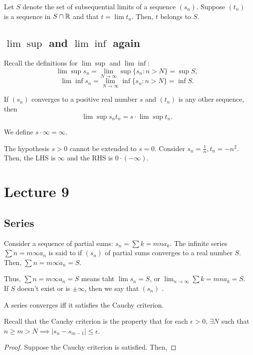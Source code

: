 \documentclass{book}
\begin{document}
\begin{thm}
    Let $S$ denote the set of subsequential limits of a sequence $(s_n)$. Suppose $(t_n)$ is a sequence in $S \cap \mathbb{R}$ and that $t = \lim t_n$. Then, $t$ belongs to $S$.
\end{thm}

\subsection{$\lim \sup$ and $\lim \inf$ again}
Recall the definitions for $\lim \sup$ and $\lim \inf$:
\[\lim \sup s_n = \lim_{N \to \infty} \sup \{s_n : n > N\} = \sup S,\] 
\[\lim \inf s_n = \lim_{N \to \infty} \inf \{s_n : n > N\} = \inf S.\]

\begin{thm}
    If $(s_n)$ converges to a positive real number $s$ and $(t_n)$ is any other sequence, then \[\lim \sup s_nt_n = s \cdot \lim \sup t_n.\]

    We define $s \cdot \infty = \infty$.
\end{thm}

The hypothesis $s > 0$ cannot be extended to $s = 0$. Consider $s_n = \frac{1}{n}, t_n = -n^2$. Then, the LHS is $\infty$ and the RHS is $0 \cdot (-\infty)$. 
\section{Lecture 9}
\subsection{Series}
Consider a sequence of partial sums: $s_n = \sum{k = m}{n} a_k$. The infinite series $\sum{n = m}{\infty} a_n$ is said to  if $(s_n)$ of partial sums converges to a real number $S$. Then, $\sum{n = m}{\infty} a_n = S$.

Thus, $\sum{n = m}{\infty} a_n = S$ means taht $\lim s_n = S$, or $\lim_{n \to \infty} \sum{k = m}{n} a_k = S$. If $S$ doesn't exist or is $\pm \infty$, then we say that $(s_n)$ .

\begin{thm}
    A series converges iff it satisfies the Cauchy criterion.
    
    Recall that the Cauchy criterion is the property that for each $\epsilon > 0$, $\exists N$ such that $n \geq m > N \implies |s_n - s_{m-1}| \leq \epsilon$.
\end{thm}

\begin{proof}
    Suppose the Cauchy criterion is satisfied. Then, 
\end{proof}
\end{document}

